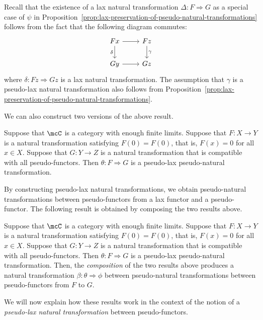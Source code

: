 \documentclass[a4paper,reqno,oneside]{article}
\begin{document}
\begin{remark}
	Recall that the existence of a lax natural transformation $\Delta : F \Rightarrow G$ as a special case of $\psi$ in Proposition~\ref{prop:lax-preservation-of-pseudo-natural-transformations} follows from the fact that the following diagram commutes:
	\[
		\begin{tikzcd}
			Fx \ar[r] \ar[d, "\delta"'] & Fz \ar[d, "\gamma"] \\
			Gy \ar[r] & Gz
		\end{tikzcd}
	\]
	where $\delta : Fz \Rightarrow Gz$ is a lax natural transformation. The assumption that $\gamma$ is a pseudo-lax natural transformation also follows from Proposition~\ref{prop:lax-preservation-of-pseudo-natural-transformations}.
\end{remark}

We can also construct two versions of the above result.

\begin{proposition}
	Suppose that $\mcC$ is a category with enough finite limits. Suppose that $F : X \to Y$ is a natural transformation satisfying $F(0) = F(0)$, that is, $F(x) = 0$ for all $x \in X$. Suppose that $G : Y \to Z$ is a natural transformation that is compatible with all pseudo-functors. Then $\theta : F \Rightarrow G$ is a pseudo-lax pseudo-natural transformation. 
\end{proposition}

By constructing pseudo-lax natural transformations, we obtain pseudo-natural transformations between pseudo-functors from a lax functor and a pseudo-functor. The following result is obtained by composing the two results above.

\begin{theorem}
	Suppose that $\mcC$ is a category with enough finite limits. Suppose that $F : X \to Y$ is a natural transformation satisfying $F(0) = F(0)$, that is, $F(x) = 0$ for all $x \in X$. Suppose that $G : Y \to Z$ is a natural transformation that is compatible with all pseudo-functors. Then $\theta : F \Rightarrow G$ is a pseudo-lax pseudo-natural transformation. Then, the \textit{composition} of the two results above produces a natural transformation $\beta : \theta \Rightarrow \phi$ between pseudo-natural transformations between pseudo-functors from $F$ to $G$. 
\end{theorem}

We will now explain how these results work in the context of the notion of a \textit{pseudo-lax natural transformation} between pseudo-functors.
\end{document}
